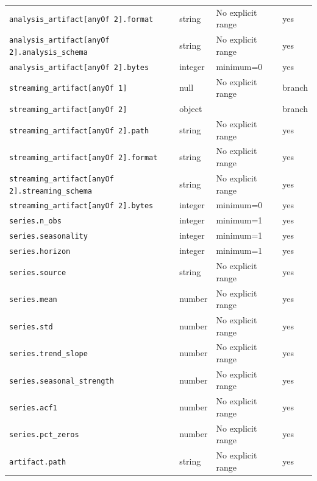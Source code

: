\begin{longtable}{@{}p{}p{}p{}p{}@{}}
\texttt{analysis\_\allowbreak{}artifact[anyOf 2].\allowbreak{}format} & string & No explicit range & yes\\
\texttt{analysis\_\allowbreak{}artifact[anyOf 2].\allowbreak{}analysis\_\allowbreak{}schema} & string & No explicit range & yes\\
\texttt{analysis\_\allowbreak{}artifact[anyOf 2].\allowbreak{}bytes} & integer & minimum=0 & yes\\
\texttt{streaming\_\allowbreak{}artifact[anyOf 1]} & null & No explicit range & branch\\
\texttt{streaming\_\allowbreak{}artifact[anyOf 2]} & object &  & branch\\
\texttt{streaming\_\allowbreak{}artifact[anyOf 2].\allowbreak{}path} & string & No explicit range & yes\\
\texttt{streaming\_\allowbreak{}artifact[anyOf 2].\allowbreak{}format} & string & No explicit range & yes\\
\texttt{streaming\_\allowbreak{}artifact[anyOf 2].\allowbreak{}streaming\_\allowbreak{}schema} & string & No explicit range & yes\\
\texttt{streaming\_\allowbreak{}artifact[anyOf 2].\allowbreak{}bytes} & integer & minimum=0 & yes\\
\texttt{series.\allowbreak{}n\_\allowbreak{}obs} & integer & minimum=1 & yes\\
\texttt{series.\allowbreak{}seasonality} & integer & minimum=1 & yes\\
\texttt{series.\allowbreak{}horizon} & integer & minimum=1 & yes\\
\texttt{series.\allowbreak{}source} & string & No explicit range & yes\\
\texttt{series.\allowbreak{}mean} & number & No explicit range & yes\\
\texttt{series.\allowbreak{}std} & number & No explicit range & yes\\
\texttt{series.\allowbreak{}trend\_\allowbreak{}slope} & number & No explicit range & yes\\
\texttt{series.\allowbreak{}seasonal\_\allowbreak{}strength} & number & No explicit range & yes\\
\texttt{series.\allowbreak{}acf1} & number & No explicit range & yes\\
\texttt{series.\allowbreak{}pct\_\allowbreak{}zeros} & number & No explicit range & yes\\
\texttt{artifact.\allowbreak{}path} & string & No explicit range & yes\\

\end{longtable}
